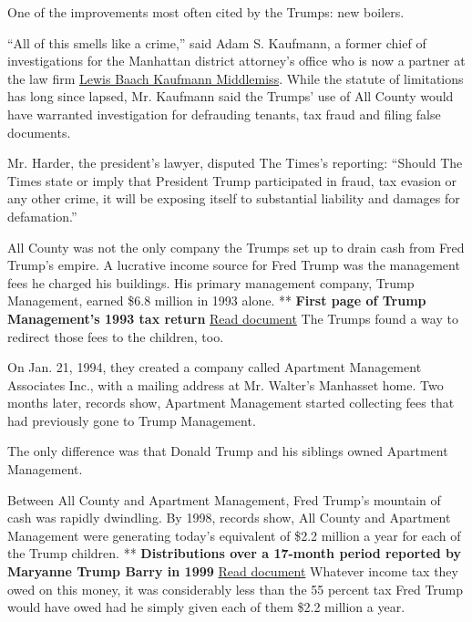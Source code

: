 One of the improvements most often cited by the Trumps: new boilers.

``All of this smells like a crime,'' said Adam S. Kaufmann, a former
chief of investigations for the Manhattan district attorney's office who
is now a partner at the law firm
\href{http://www.lbkmlaw.com/attorneys-Adam-Kaufmann.html}{Lewis Baach
Kaufmann Middlemiss}. While the statute of limitations has long since
lapsed, Mr. Kaufmann said the Trumps' use of All County would have
warranted investigation for defrauding tenants, tax fraud and filing
false documents.

Mr. Harder, the president's lawyer, disputed The Times's reporting:
``Should The Times state or imply that President Trump participated in
fraud, tax evasion or any other crime, it will be exposing itself to
substantial liability and damages for defamation.''

All County was not the only company the Trumps set up to drain cash from
Fred Trump's empire. A lucrative income source for Fred Trump was the
management fees he charged his buildings. His primary management
company, Trump Management, earned \$6.8 million in 1993 alone. **
\textbf{First page of Trump Management's 1993 tax return}
\href{https://int.nyt.com/data/documenthelper/131-trump-management-federal-tax-r/64042c0185c31172baee/optimized/full.pdf\#page=1}{Read
document} The Trumps found a way to redirect those fees to the children,
too.

On Jan. 21, 1994, they created a company called Apartment Management
Associates Inc., with a mailing address at Mr. Walter's Manhasset home.
Two months later, records show, Apartment Management started collecting
fees that had previously gone to Trump Management.

The only difference was that Donald Trump and his siblings owned
Apartment Management.

Between All County and Apartment Management, Fred Trump's mountain of
cash was rapidly dwindling. By 1998, records show, All County and
Apartment Management were generating today's equivalent of \$2.2 million
a year for each of the Trump children. ** \textbf{Distributions over a
17-month period reported by Maryanne Trump Barry in 1999}
\href{https://int.nyt.com/data/documenthelper/139-marryanne-trump-barry/76fe49efb6b1ae8eabe3/optimized/full.pdf\#page=1}{Read
document} Whatever income tax they owed on this money, it was
considerably less than the 55 percent tax Fred Trump would have owed had
he simply given each of them \$2.2 million a year.


